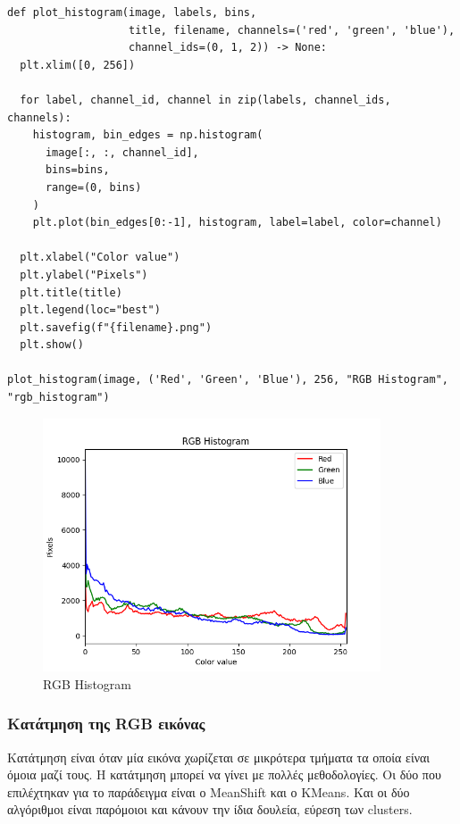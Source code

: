 \begin{verbatim}
def plot_histogram(image, labels, bins,
                   title, filename, channels=('red', 'green', 'blue'),
                   channel_ids=(0, 1, 2)) -> None:
  plt.xlim([0, 256])

  for label, channel_id, channel in zip(labels, channel_ids, channels):
    histogram, bin_edges = np.histogram(
      image[:, :, channel_id],
      bins=bins,
      range=(0, bins)
    )
    plt.plot(bin_edges[0:-1], histogram, label=label, color=channel)

  plt.xlabel("Color value")
  plt.ylabel("Pixels")
  plt.title(title)
  plt.legend(loc="best")
  plt.savefig(f"{filename}.png")
  plt.show()

plot_histogram(image, ('Red', 'Green', 'Blue'), 256, "RGB Histogram", "rgb_histogram")
\end{verbatim}

\begin{figure}[H]
  \centering
  \includegraphics[width=100mm]{Figures/rgb_histogram}
  \caption{RGB Histogram}
  \label{fig:rgb_histogram}
\end{figure}

\subsubsection{Κατάτμηση της RGB εικόνας}

Κατάτμηση είναι όταν μία εικόνα χωρίζεται σε μικρότερα τμήματα τα οποία είναι όμοια μαζί τους. Η κατάτμηση μπορεί να γίνει με πολλές μεθοδολογίες. Οι δύο που επιλέχτηκαν για το παράδειγμα είναι ο MeanShift και ο KMeans. Και οι δύο αλγόριθμοι είναι παρόμοιοι και κάνουν την ίδια δουλεία, εύρεση των clusters.

